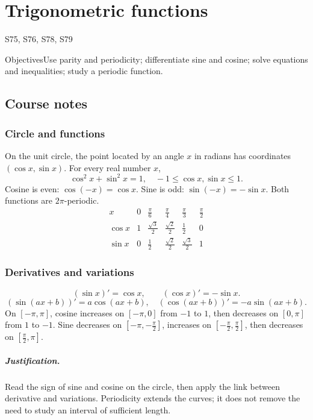 \setcounter{chapter}{4}\chapter{Trigonometric functions}\label{ch:5}

{\small\sffamily\color{teal}S75, S76, S78, S79\par}

\begin{retenir}{Objectives}Use parity and periodicity; differentiate sine and cosine; solve equations and inequalities; study a periodic function.\end{retenir}

\section{Course notes}
\subsection{Circle and functions}
On the unit circle, the point located by an angle $x$ in radians has coordinates $(\cos x,\sin x)$. For every real number $x$,
\[\cos^2x+\sin^2x=1,\quad -1\le\cos x,\sin x\le1.\]
Cosine is even: $\cos(-x)=\cos x$. Sine is odd: $\sin(-x)=-\sin x$. Both functions are $2\pi$-periodic.
\[\begin{array}{c|ccccc}x&0&\frac{\pi}{6}&\frac{\pi}{4}&\frac{\pi}{3}&\frac{\pi}{2}\\\hline
\cos x&1&\frac{\sqrt{3}}{2}&\frac{\sqrt{2}}{2}&\frac{1}{2}&0\\
\sin x&0&\frac{1}{2}&\frac{\sqrt{2}}{2}&\frac{\sqrt{3}}{2}&1
\end{array}\]
\subsection{Derivatives and variations}
\[(\sin x)'=\cos x,\qquad(\cos x)'=-\sin x.\]\[
(\sin(ax+b))'=a\cos(ax+b),\quad(\cos(ax+b))'=-a\sin(ax+b).\]
On $[-\pi,\pi]$, cosine increases on $[-\pi,0]$ from $-1$ to $1$, then decreases on $[0,\pi]$ from $1$ to $-1$. Sine decreases on $[-\pi,-\frac{\pi}{2}]$, increases on $[-\frac{\pi}{2},\frac{\pi}{2}]$, then decreases on $[\frac{\pi}{2},\pi]$.
\paragraph{Justification.} Read the sign of sine and cosine on the circle, then apply the link between derivative and variations. Periodicity extends the curves; it does not remove the need to study an interval of sufficient length.
